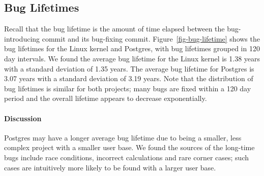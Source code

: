 \subsection{Bug Lifetimes}
\label{sec-bug-lifetime}
Recall that the bug lifetime is the amount of time elapsed between the
bug-introducing commit and its bug-fixing commit.
Figure~\ref{fig-bug-lifetime} shows the bug lifetimes for the Linux
kernel and Postgres, with bug lifetimes grouped in 120 day
intervals. We found the average bug lifetime for the Linux kernel is
1.38 years with a standard deviation of 1.35 years. The average bug
lifetime for Postgres is 3.07 years with a standard deviation of 3.19
years. Note that the distribution of bug lifetimes is similar for both
projects; many bugs are fixed within a 120 day period and the overall
lifetime appears to decrease exponentially.

\paragraph{Discussion}
Postgres may have a longer average bug lifetime due to being a
smaller, less complex project with a smaller user base. We found the
sources of the long-time bugs include race conditions, incorrect
calculations and rare corner cases; such cases are intuitively more
likely to be found with a larger user base.  

